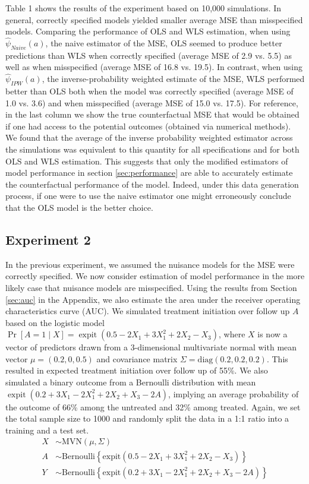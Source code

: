 Table 1 shows the results of the experiment based on 10,000 simulations. In general, correctly specified models yielded smaller average MSE than misspecified models. Comparing the performance of OLS and WLS estimation, when using $\widehat{\psi}_{Naive}(a)$, the naive estimator of the MSE, OLS seemed to produce better predictions than WLS when correctly specified (average MSE of 2.9 vs. 5.5) as well as when misspecified (average MSE of 16.8 vs. 19.5). In contrast, when using $\widehat{\psi}_{IPW}(a)$, the inverse-probability weighted estimate of the MSE, WLS performed better than OLS both when the model was correctly specified (average MSE of 1.0 vs. 3.6) and when misspecified (average MSE of 15.0 vs. 17.5). For reference, in the last column we show the true counterfactual MSE that would be obtained if one had access to the potential outcomes (obtained via numerical methods). We found that the average of the inverse probability weighted estimator across the simulations was equivalent to this quantity for all specifications and for both OLS and WLS estimation. This suggests that only the modified estimators of model performance in section \ref{sec:performance} are able to accurately estimate the counterfactual performance of the model. Indeed, under this data generation process, if one were to use the naive estimator one might erroneously conclude that the OLS model is the better choice.


\subsection{Experiment 2}

In the previous experiment, we assumed the nuisance models for the MSE were correctly specified. We now consider estimation of model performance in the more likely case that nuisance models are misspecified. Using the results from Section \ref{sec:auc} in the Appendix, we also estimate the area under the receiver operating characteristics curve (AUC). We simulated treatment initiation over follow up $A$ based on the logistic model $\operatorname{Pr}[A=1 \mid X]=\operatorname{expit}(0.5 - 2 X_1 + 3 X_1^2 + 2 X_2 - X_3)$, where $X$ is now a vector of predictors drawn from a 3-dimensional multivariate normal with mean vector $\mu = (0.2, 0, 0.5)$ and covariance matrix $\Sigma = \text{diag}(0.2, 0.2, 0.2)$. This resulted in expected treatment initiation over follow up of 55\%. We also simulated a binary outcome from a Bernoulli distribution with mean $\operatorname{expit}(0.2 + 3 X_1 - 2 X_1^2 + 2 X_2 + X_3 - 2 A)$, implying an average probability of the outcome of 66\% among the untreated and 32\% among treated. Again, we set the total sample size to 1000 and randomly split the data in a 1:1 ratio into a training and a test set. 
\begin{align*}
    X & \sim \text{MVN}(\mu, \Sigma) \\
    A & \sim \text{Bernoulli}\left\{\text{expit}\left(0.5 - 2 X_1 + 3 X_1^2 + 2 X_2 - X_3\right)\right\} \\
    Y & \sim \text{Bernoulli}\left\{\text{expit}\left(0.2 + 3 X_1 - 2 X_1^2 + 2 X_2 + X_3 - 2 A\right)\right\}
\end{align*}

